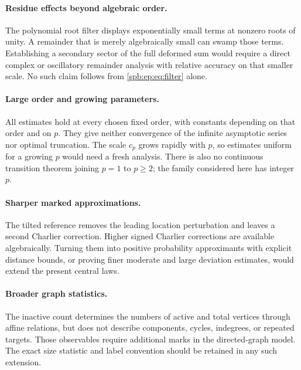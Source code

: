 \paragraph{Residue effects beyond algebraic order.}
The polynomial root filter displays exponentially small terms at nonzero
roots of unity. A remainder that is merely algebraically small can swamp
those terms. Establishing a secondary sector of the full deformed sum
would require a direct complex or oscillatory remainder analysis with
relative accuracy on that smaller scale. No such claim follows from
\eqref{spb:ep:eq:filter} alone.

\paragraph{Large order and growing parameters.}
All estimates hold at every chosen fixed order, with constants depending on
that order and on $p$. They give neither convergence of the infinite
asymptotic series nor optimal truncation. The scale $c_p$ grows rapidly
with $p$, so estimates uniform for a growing $p$ would need a fresh analysis.
There is also no continuous transition theorem joining $p=1$ to $p\ge2$;
the family considered here has integer $p$.

\paragraph{Sharper marked approximations.}
The tilted reference removes the leading location perturbation and leaves
a second Charlier correction. Higher signed Charlier corrections are
available algebraically. Turning them into positive probability
approximants with explicit distance bounds, or proving finer moderate
and large deviation estimates, would extend the present central laws.

\paragraph{Broader graph statistics.}
The inactive count determines the numbers of active and total vertices
through affine relations, but does not describe components, cycles,
indegrees, or repeated targets. Those observables require additional marks
in the directed-graph model. The exact size statistic and label convention
should be retained in any such extension.

